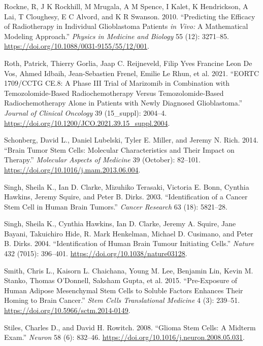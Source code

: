 \documentclass[
  letterpaper,
]{scrreprt}
\newlength{\cslhangindent}
\newenvironment{CSLReferences}[2] %
 {\begin{list}{}{%
  \setlength{\itemindent}{0pt}
  \setlength{\leftmargin}{0pt}
  \setlength{\parsep}{0pt}
  \ifodd #1
   \setlength{\leftmargin}{\cslhangindent}
   \setlength{\itemindent}{-1\cslhangindent}
  \fi
  \setlength{\itemsep}{#2\baselineskip}}}
 {\end{list}}
\theoremstyle{definition}
\theoremstyle{remark}
\begin{document}
\begin{CSLReferences}{1}{0}
Rockne, R, J K Rockhill, M Mrugala, A M Spence, I Kalet, K Hendrickson,
A Lai, T Cloughesy, E C Alvord, and K R Swanson. 2010. {``Predicting the
Efficacy of Radiotherapy in Individual Glioblastoma Patients {\emph{in
Vivo:}} A Mathematical Modeling Approach.''} \emph{Physics in Medicine
and Biology} 55 (12): 3271--85.
\url{https://doi.org/10.1088/0031-9155/55/12/001}.

Roth, Patrick, Thierry Gorlia, Jaap C. Reijneveld, Filip Yves Francine
Leon De Vos, Ahmed Idbaih, Jean-Sebastien Frenel, Emilie Le Rhun, et al.
2021. {``EORTC 1709/CCTG CE.8: A Phase III Trial of Marizomib in
Combination with Temozolomide-Based Radiochemotherapy Versus
Temozolomide-Based Radiochemotherapy Alone in Patients with Newly
Diagnosed Glioblastoma.''} \emph{Journal of Clinical Oncology} 39
(15{\_}suppl): 2004--4.
\url{https://doi.org/10.1200/JCO.2021.39.15_suppl.2004}.

Schonberg, David L., Daniel Lubelski, Tyler E. Miller, and Jeremy N.
Rich. 2014. {``Brain Tumor Stem Cells: Molecular Characteristics and
Their Impact on Therapy.''} \emph{Molecular Aspects of Medicine} 39
(October): 82--101. \url{https://doi.org/10.1016/j.mam.2013.06.004}.

Singh, Sheila K., Ian D. Clarke, Mizuhiko Terasaki, Victoria E. Bonn,
Cynthia Hawkins, Jeremy Squire, and Peter B. Dirks. 2003.
{``Identification of a Cancer Stem Cell in Human Brain Tumors.''}
\emph{Cancer Research} 63 (18): 5821--28.

Singh, Sheila K., Cynthia Hawkins, Ian D. Clarke, Jeremy A. Squire, Jane
Bayani, Takuichiro Hide, R. Mark Henkelman, Michael D. Cusimano, and
Peter B. Dirks. 2004. {``Identification of Human Brain Tumour Initiating
Cells.''} \emph{Nature} 432 (7015): 396--401.
\url{https://doi.org/10.1038/nature03128}.

Smith, Chris L., Kaisorn L. Chaichana, Young M. Lee, Benjamin Lin, Kevin
M. Stanko, Thomas O'Donnell, Saksham Gupta, et al. 2015. {``Pre-Exposure
of Human Adipose Mesenchymal Stem Cells to Soluble Factors Enhances
Their Homing to Brain Cancer.''} \emph{Stem Cells Translational
Medicine} 4 (3): 239--51. \url{https://doi.org/10.5966/sctm.2014-0149}.

Stiles, Charles D., and David H. Rowitch. 2008. {``Glioma Stem Cells: A
Midterm Exam.''} \emph{Neuron} 58 (6): 832--46.
\url{https://doi.org/10.1016/j.neuron.2008.05.031}.


\end{CSLReferences}
\end{document}
